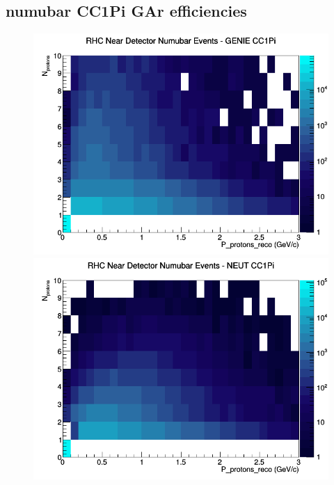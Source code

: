 \subsection{numubar CC1Pi GAr efficiencies}
\begin{figure}[h]
\includegraphics[width=\linewidth]{eff_N_P/GAr/protons/CC1Pi_RHC_ND_numubar_N_P_GENIE.png}
\endminipage
{}
\includegraphics[width=\linewidth]{eff_N_P/GAr/protons/CC1Pi_RHC_ND_numubar_N_P_NEUT.png}
\endminipage
{}

\end{figure}

